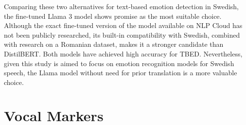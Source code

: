 Comparing these two alternatives for text-based emotion detection in Swedish, the fine-tuned Llama 3 model shows promise as the most suitable choice. Although the exact fine-tuned version of the model available on NLP Cloud has not been publicly researched, its built-in compatibility with Swedish, combined with research on a Romanian dataset, makes it a stronger candidate than DistilBERT. Both models have achieved high accuracy for TBED. Nevertheless, given this study is aimed to focus on emotion recognition models for Swedish speech, the Llama model without need for prior translation is a more valuable choice.

 

\section{Vocal Markers}
\label{sec:vocal-markers}

